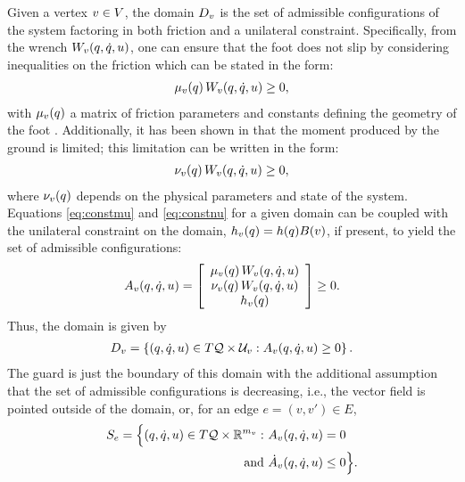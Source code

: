 Given a vertex $v \in V$, the domain $D_{v}$ is the set of admissible
configurations of the system factoring in both friction and a unilateral
constraint.
%
Specifically, from the wrench $W_{v}(q, \dot{q}, u)$, one can ensure that the foot
does not slip by considering inequalities on the friction which can be stated in
the form:
%
\begin{align}
  \label{eq:constmu}
  \mu_{v}(q) \, W_{v}(q, \dot{q}, u) \geq 0,
\end{align}
%
with $\mu_{v}(q)$ a matrix of friction parameters and constants defining the
geometry of the foot \cite{Grizzle2010}.
%
Additionally, it has been shown in \cite{Chevallereau2009, Vukobratovic1990}
that the moment produced by the ground is limited; this limitation can be
written in the form:
%
\begin{align}
  \label{eq:constnu}
  \nu_{v}(q) \, W_{v}(q, \dot{q}, u) \geq 0,
\end{align}
%
where $\nu_{v}(q)$ depends on the physical parameters and state of the
system.
%
Equations \eqref{eq:constmu} and \eqref{eq:constnu} for a given domain can be
coupled with the unilateral constraint on the domain, $h_{v}(q) = h(q)
B(v)$, if present, to yield the set of admissible configurations:
%
\begin{align}
  \label{admissible}
  A_{v}(q, \dot{q}, u) = \left[ \begin{array}{c}
      \mu_{v}(q) \, W_{v}(q, \dot{q}, u)\\
      \nu_{v}(q) \, W_{v}(q, \dot{q}, u)\\
      h_{v}(q)
    \end{array} \right] \geq 0.
\end{align}
%
Thus, the domain is given by
%
\begin{align}
  \label{eq:domain}
  D_{v} = \left\{ (q, \dot{q}, u) \in T\mathcal{Q}
    \times \mathcal{U}_{v} : A_{v}(q, \dot{q}, u) \geq 0 \right\}.
\end{align}
%
The guard is just the boundary of this domain with the additional assumption
that the set of admissible configurations is decreasing, i.e., the vector field
is pointed outside of the domain, or, for an edge $e = (v, v') \in E$,
%
\begin{align*}
  S_{e} = \Bigl\{ (q, \dot{q}, u) \in T\mathcal{Q} \times
  \mathbb{R}^{m_v} : \ &A_{v}(q, \dot{q}, u) = 0 \\
  \mbox{and } &{\dot A}_{v}(q, \dot{q}, u) \leq 0 \Bigl\}.
\end{align*}

